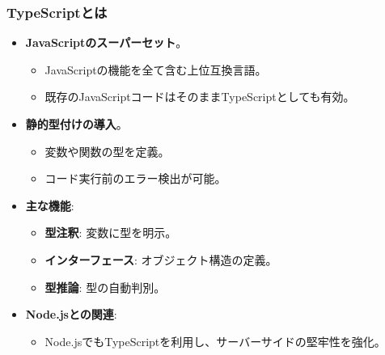 \documentclass{beamer}
\begin{document}
\begin{frame}
    \frametitle{TypeScriptとは}
    \begin{itemize}
        \item \textbf{JavaScriptのスーパーセット}。
            \begin{itemize}
                \item JavaScriptの機能を全て含む上位互換言語。
                \item 既存のJavaScriptコードはそのままTypeScriptとしても有効。
            \end{itemize}
        \item \textbf{静的型付けの導入}。
            \begin{itemize}
                \item 変数や関数の型を定義。
                \item コード実行前のエラー検出が可能。
            \end{itemize}
        \item \textbf{主な機能}:
            \begin{itemize}
                \item \textbf{型注釈}: 変数に型を明示。
                \item \textbf{インターフェース}: オブジェクト構造の定義。
                \item \textbf{型推論}: 型の自動判別。
            \end{itemize}
        \item \textbf{Node.jsとの関連}:
            \begin{itemize}
                \item Node.jsでもTypeScriptを利用し、サーバーサイドの堅牢性を強化。
            \end{itemize}
    \end{itemize}
\end{frame}
\end{document}
